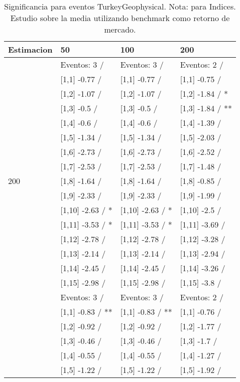 \begin{table}

\caption{Significancia para eventos TurkeyGeophysical. Nota: para Indices. Estudio sobre la media utilizando benchmark como retorno de mercado.}
\centering
\begin{tabular}[t]{llll}
\toprule
Estimacion & 50 & 100 & 200\\
\midrule
 & Eventos:  3 / & Eventos:  3 / & Eventos:  2 /\\
 & {}[1,1] -0.77  / & {}[1,1] -0.77  / & {}[1,1] -0.75  /\\
 & {}[1,2] -1.07  / & {}[1,2] -1.07  / & {}[1,2] -1.84  / *\\
 & {}[1,3] -0.5  / & {}[1,3] -0.5  / & {}[1,3] -1.84  / **\\
 & {}[1,4] -0.6  / & {}[1,4] -0.6  / & {}[1,4] -1.39  /\\
\addlinespace
 & {}[1,5] -1.34  / & {}[1,5] -1.34  / & {}[1,5] -2.03  /\\
 & {}[1,6] -2.73  / & {}[1,6] -2.73  / & {}[1,6] -2.52  /\\
 & {}[1,7] -2.53  / & {}[1,7] -2.53  / & {}[1,7] -1.48  /\\
200 & {}[1,8] -1.64  / & {}[1,8] -1.64  / & {}[1,8] -0.85  /\\
 & {}[1,9] -2.33  / & {}[1,9] -2.33  / & {}[1,9] -1.99  /\\
\addlinespace
 & {}[1,10] -2.63  / * & {}[1,10] -2.63  / * & {}[1,10] -2.5  /\\
 & {}[1,11] -3.53  / * & {}[1,11] -3.53  / * & {}[1,11] -3.69  /\\
 & {}[1,12] -2.78  / & {}[1,12] -2.78  / & {}[1,12] -3.28  /\\
 & {}[1,13] -2.14  / & {}[1,13] -2.14  / & {}[1,13] -2.94  /\\
 & {}[1,14] -2.45  / & {}[1,14] -2.45  / & {}[1,14] -3.26  /\\
\addlinespace
 & {}[1,15] -2.98  / & {}[1,15] -2.98  / & {}[1,15] -3.8  /\\
 & Eventos:  3 / & Eventos:  3 / & Eventos:  2 /\\
 & {}[1,1] -0.83  / ** & {}[1,1] -0.83  / ** & {}[1,1] -0.76  /\\
 & {}[1,2] -0.92  / & {}[1,2] -0.92  / & {}[1,2] -1.77  /\\
 & {}[1,3] -0.46  / & {}[1,3] -0.46  / & {}[1,3] -1.7  /\\
\addlinespace
 & {}[1,4] -0.55  / & {}[1,4] -0.55  / & {}[1,4] -1.27  /\\
 & {}[1,5] -1.22  / & {}[1,5] -1.22  / & {}[1,5] -1.92  /\\

\end{tabular}
\end{table}
